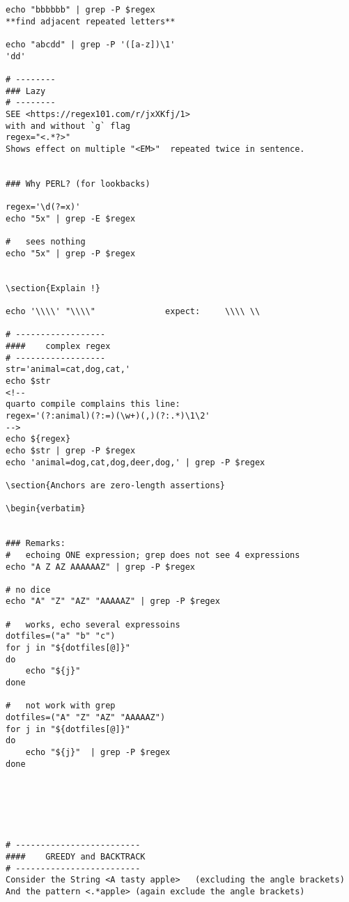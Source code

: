 \documentclass[
  letterpaper,
  DIV=11,
  numbers=noendperiod]{scrartcl}
\begin{document}
\begin{verbatim}
echo "bbbbbb" | grep -P $regex 
**find adjacent repeated letters**

echo "abcdd" | grep -P '([a-z])\1'
'dd'

# --------
### Lazy
# --------
SEE <https://regex101.com/r/jxXKfj/1>
with and without `g` flag
regex="<.*?>"
Shows effect on multiple "<EM>"  repeated twice in sentence.


### Why PERL? (for lookbacks) 

regex='\d(?=x)'
echo "5x" | grep -E $regex

#   sees nothing
echo "5x" | grep -P $regex


\section{Explain !}

echo '\\\\' "\\\\"              expect:     \\\\ \\ 

# ------------------
####    complex regex
# ------------------
str='animal=cat,dog,cat,'
echo $str
<!--
quarto compile complains this line:
regex='(?:animal)(?:=)(\w+)(,)(?:.*)\1\2'
-->
echo ${regex}
echo $str | grep -P $regex
echo 'animal=dog,cat,dog,deer,dog,' | grep -P $regex

\section{Anchors are zero-length assertions}

\begin{verbatim}


### Remarks:
#   echoing ONE expression; grep does not see 4 expressions
echo "A Z AZ AAAAAAZ" | grep -P $regex

# no dice
echo "A" "Z" "AZ" "AAAAAZ" | grep -P $regex

#   works, echo several expressoins
dotfiles=("a" "b" "c")
for j in "${dotfiles[@]}"
do
    echo "${j}" 
done

#   not work with grep
dotfiles=("A" "Z" "AZ" "AAAAAZ")
for j in "${dotfiles[@]}"
do
    echo "${j}"  | grep -P $regex
done






# -------------------------
####    GREEDY and BACKTRACK
# -------------------------
Consider the String <A tasty apple>   (excluding the angle brackets)
And the pattern <.*apple> (again exclude the angle brackets)



\end{verbatim}
\end{document}
